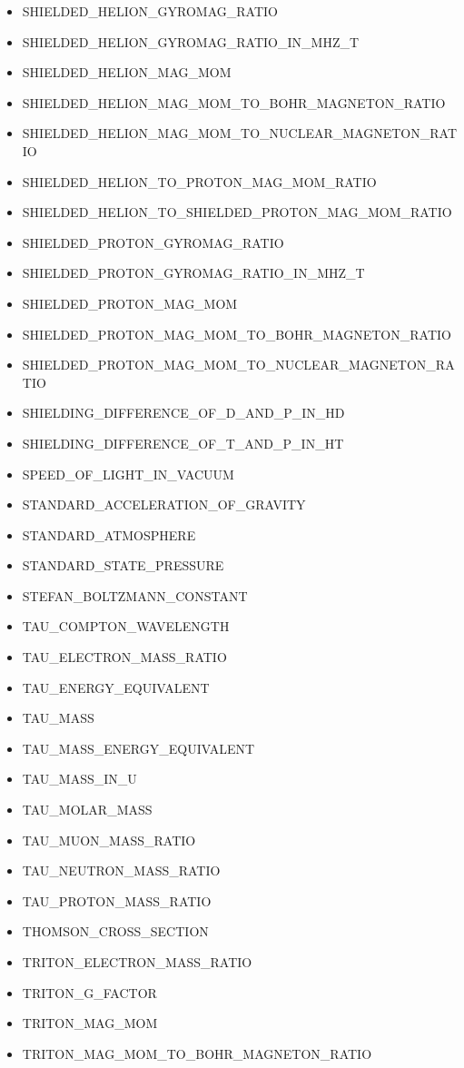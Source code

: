 \begin{itemize}
\item SHIELDED\_HELION\_GYROMAG\_RATIO
\item SHIELDED\_HELION\_GYROMAG\_RATIO\_IN\_MHZ\_T
\item SHIELDED\_HELION\_MAG\_MOM
\item SHIELDED\_HELION\_MAG\_MOM\_TO\_BOHR\_MAGNETON\_RATIO
\item SHIELDED\_HELION\_MAG\_MOM\_TO\_NUCLEAR\_MAGNETON\_RATIO
\item SHIELDED\_HELION\_TO\_PROTON\_MAG\_MOM\_RATIO
\item SHIELDED\_HELION\_TO\_SHIELDED\_PROTON\_MAG\_MOM\_RATIO
\item SHIELDED\_PROTON\_GYROMAG\_RATIO
\item SHIELDED\_PROTON\_GYROMAG\_RATIO\_IN\_MHZ\_T
\item SHIELDED\_PROTON\_MAG\_MOM
\item SHIELDED\_PROTON\_MAG\_MOM\_TO\_BOHR\_MAGNETON\_RATIO
\item SHIELDED\_PROTON\_MAG\_MOM\_TO\_NUCLEAR\_MAGNETON\_RATIO
\item SHIELDING\_DIFFERENCE\_OF\_D\_AND\_P\_IN\_HD
\item SHIELDING\_DIFFERENCE\_OF\_T\_AND\_P\_IN\_HT
\item SPEED\_OF\_LIGHT\_IN\_VACUUM
\item STANDARD\_ACCELERATION\_OF\_GRAVITY
\item STANDARD\_ATMOSPHERE
\item STANDARD\_STATE\_PRESSURE
\item STEFAN\_BOLTZMANN\_CONSTANT
\item TAU\_COMPTON\_WAVELENGTH
\item TAU\_ELECTRON\_MASS\_RATIO
\item TAU\_ENERGY\_EQUIVALENT
\item TAU\_MASS
\item TAU\_MASS\_ENERGY\_EQUIVALENT
\item TAU\_MASS\_IN\_U
\item TAU\_MOLAR\_MASS
\item TAU\_MUON\_MASS\_RATIO
\item TAU\_NEUTRON\_MASS\_RATIO
\item TAU\_PROTON\_MASS\_RATIO
\item THOMSON\_CROSS\_SECTION
\item TRITON\_ELECTRON\_MASS\_RATIO
\item TRITON\_G\_FACTOR
\item TRITON\_MAG\_MOM
\item TRITON\_MAG\_MOM\_TO\_BOHR\_MAGNETON\_RATIO

\end{itemize}

